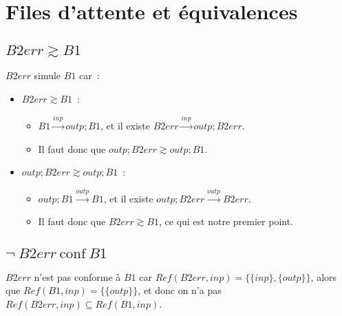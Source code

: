 \documentclass[a4paper,french,12pt]{article}
\def\transition#1{\stackrel{#1}{\longrightarrow}}
\def\conf{\ \text{conf}\ }
\let\simule\gtrsim
\begin{document}
\section{Files d'attente et équivalences}
\subsection{$B2err\simule B1$}

$B2err$ simule $B1$ car~:
\begin{itemize}
\item $B2err \simule B1$~:
  \begin{itemize}
  \item $B1\transition{inp} outp;B1$, et il existe $B2err\transition{inp}outp;B2err$.
  \item Il faut donc que $outp;B2err \simule outp;B1$.
  \end{itemize}
\item $outp;B2err \simule outp;B1$~:
  \begin{itemize}
  \item $outp;B1\transition{outp}B1$, et il existe $outp;B2err\transition{outp}B2err$.
  \item Il faut donc que $B2err \simule B1$, ce qui est notre premier point.
  \end{itemize}
\end{itemize}

\subsection{$\neg\ B2err\conf B1$}
$B2err$ n'est pas conforme à $B1$ car $Ref(B2err, inp) = \{\{inp\}, \{outp\}\}$, alors que $Ref(B1,inp) = \{\{outp\}\}$,
et donc on n'a pas $Ref(B2err, inp) \subseteq Ref(B1, inp)$.
\end{document}
